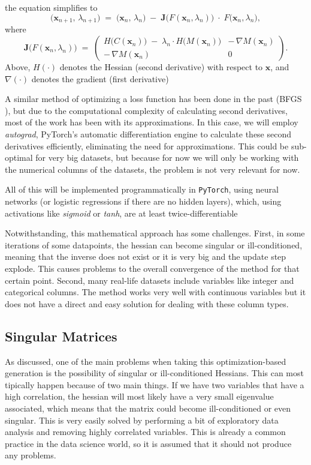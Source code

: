 \documentclass[12pt]{extarticle}
\numberwithin{equation}{section}
\begin{document}
the equation simplifies to
\[
\bigl(\mathbf{x}_{n+1},\,\lambda_{n+1}\bigr)
\;=\;
\bigl(\mathbf{x}_n,\,\lambda_n\bigr)
\;-\;
\mathbf{J}\!\bigl(F(\mathbf{x}_n,\lambda_n)\bigr)
\;\cdot\;
F\!\bigl(\mathbf{x}_n,\lambda_n\bigr),
\]
where
\[
\mathbf{J}\!\bigl(F(\mathbf{x}_n,\lambda_n)\bigr)
\;=\;
\begin{pmatrix}
H\!\bigl(C(\mathbf{x}_n)\bigr)\;-\;\lambda_n \cdot H\!\bigl(M(\mathbf{x}_n)\bigr) 
    & -\,\nabla M(\mathbf{x}_n)
\\[6pt]
-\,\nabla M(\mathbf{x}_n)
    & 0
\end{pmatrix}.
\]
Above, $H(\cdot)$ denotes the Hessian (second derivative) with respect to $\mathbf{x}$, 
and $\nabla(\cdot)$ denotes the gradient (first derivative)

A similar method of optimizing a loss function has been done in the past (BFGS \cite{papakonstantinou2009historical}), 
but due to the computational complexity of calculating second derivatives, most of the work has been with its approximations. In this case, we will employ \emph{autograd}, PyTorch's automatic differentiation engine to calculate these second derivatives efficiently, eliminating the need for approximations. This could be sub-optimal for very big datasets, but because for now we will only be working with the numerical columns of the datasets, the problem is not very relevant for now.

All of this will be implemented programmatically in \texttt{PyTorch}, using neural networks (or logistic regressions if there are no hidden layers), which, using activations like \emph{sigmoid} or \emph{tanh}, are at least twice-differentiable

Notwithstanding, this mathematical approach has some challenges. 
First, in some iterations of some datapoints, the hessian can become singular or ill-conditioned, meaning that the inverse does not exist or it is very big and the update step explode. This causes problems to the overall convergence of the method for that certain point. 
Second, many real-life datasets include variables like integer and categorical columns. The method works very well with continuous variables but it does not have a direct and easy solution for dealing with these column types.

\subsection{Singular Matrices}\label{sec:singular}
As discussed, one of the main problems when taking this optimization-based generation is the possibility of singular or ill-conditioned Hessians. This can most tipically happen because of two main things. If we have two variables that have a high correlation, the hessian  will most likely have a very small eigenvalue associated, which means that the matrix could become ill-conditioned or even singular. This is very easily solved by performing a bit of exploratory data analysis and removing highly correlated variables. This is already a common practice in the data science world, so it is assumed that it should not produce any problems.
\end{document}
